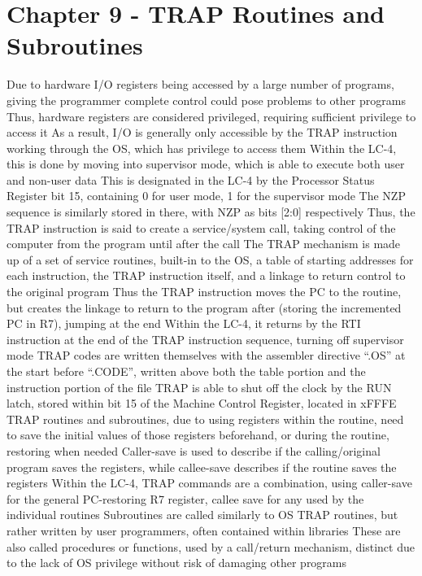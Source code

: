 \documentclass[11 pt, twoside]{article}
\newenvironment{outline*}
{
	\begin{outline}[enumerate]
	}
	{\end{outline}
}
\begin{document}
\section{Chapter 9 - TRAP Routines and Subroutines}
\begin{outline*}
\1 Due to hardware I/O registers being accessed by a large number of programs, giving the programmer complete control could pose problems to other programs
\2 Thus, hardware registers are considered privileged, requiring sufficient privilege to access it
\2 As a result, I/O is generally only accessible by the TRAP instruction working through the OS, which has privilege to access them
\3 Within the LC-4, this is done by moving into supervisor mode, which is able to execute both user and non-user data
\3 This is designated in the LC-4 by the Processor Status Register bit 15, containing 0 for user mode, 1 for the supervisor mode
\4 The NZP sequence is similarly stored in there, with NZP as bits [2:0] respectively
\2 Thus, the TRAP instruction is said to create a service/system call, taking control of the computer from the program until after the call
\1 The TRAP mechanism is made up of a set of service routines, built-in to the OS, a table of starting addresses for each instruction, the TRAP instruction itself, and a linkage to return control to the original program
\2 Thus the TRAP instruction moves the PC to the routine, but creates the linkage to return to the program after (storing the incremented PC in R7), jumping at the end
\2 Within the LC-4, it returns by the RTI instruction at the end of the TRAP instruction sequence, turning off supervisor mode
\2 TRAP codes are written themselves with the assembler directive ``.OS'' at the start before ``.CODE'', written above both the table portion and the instruction portion of the file
\1 TRAP is able to shut off the clock by the RUN latch, stored within bit 15 of the Machine Control Register, located in xFFFE
\1 TRAP routines and subroutines, due to using registers within the routine, need to save the initial values of those registers beforehand, or during the routine, restoring when needed
\2 Caller-save is used to describe if the calling/original program saves the registers, while callee-save describes if the routine saves the registers
\2 Within the LC-4, TRAP commands are a combination, using caller-save for the general PC-restoring R7 register, callee save for any used by the individual routines
\1 Subroutines are called similarly to OS TRAP routines, but rather written by user programmers, often contained within libraries
\2 These are also called procedures or functions, used by a call/return mechanism, distinct due to the lack of OS privilege without risk of damaging other programs

\end{outline*}
\end{document}
